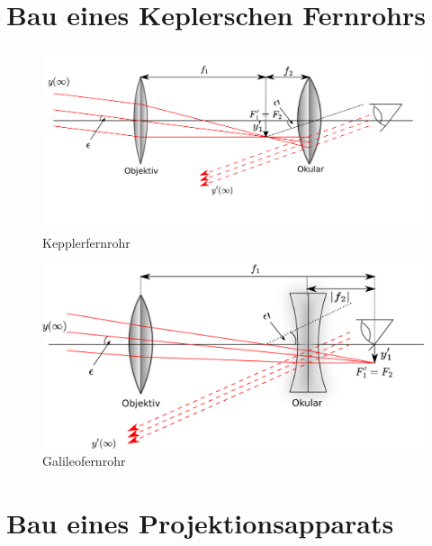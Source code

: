 \section{Bau eines Keplerschen Fernrohrs}

\begin{figure}
    \centering
    \includegraphics[scale=0.8]{Geometrische_Optik/Protokoll/fig/Kepplerfernrohr.png}
    \caption{Kepplerfernrohr}
    \label{fig:Kepplerfernrohr}
\end{figure}

\begin{figure}
    \centering
    \includegraphics[scale=0.8]{Geometrische_Optik/Protokoll/fig/Galileofernrohr.png}
    \caption{Galileofernrohr}
    \label{fig:Galileofernrohr}
\end{figure}

\section{Bau eines Projektionsapparats}

